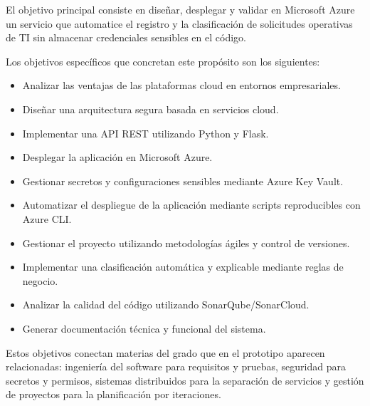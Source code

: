
El objetivo principal consiste en diseñar, desplegar y validar en Microsoft Azure un servicio que automatice el registro y la clasificación de solicitudes operativas de TI sin almacenar credenciales sensibles en el código.

Los objetivos específicos que concretan este propósito son los siguientes:

\begin{itemize}
    \item Analizar las ventajas de las plataformas cloud en entornos empresariales.
    \item Diseñar una arquitectura segura basada en servicios cloud.
    \item Implementar una API REST utilizando Python y Flask.
    \item Desplegar la aplicación en Microsoft Azure.
    \item Gestionar secretos y configuraciones sensibles mediante Azure Key Vault.
    \item Automatizar el despliegue de la aplicación mediante scripts reproducibles con Azure CLI.
    \item Gestionar el proyecto utilizando metodologías ágiles y control de versiones.
    \item Implementar una clasificación automática y explicable mediante reglas de negocio.
    \item Analizar la calidad del código utilizando SonarQube/SonarCloud.
    \item Generar documentación técnica y funcional del sistema.
\end{itemize}

Estos objetivos conectan materias del grado que en el prototipo aparecen relacionadas: ingeniería del software para requisitos y pruebas, seguridad para secretos y permisos, sistemas distribuidos para la separación de servicios y gestión de proyectos para la planificación por iteraciones.
